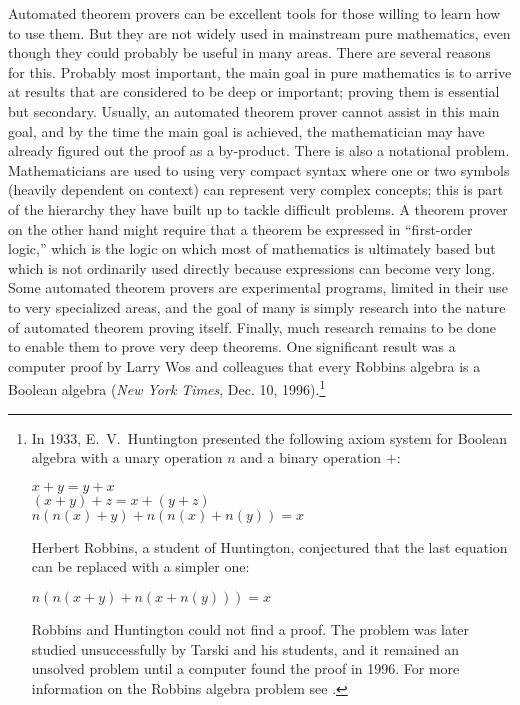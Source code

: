 Automated theorem provers can be excellent tools for those willing to learn
how to use them.  But they are not widely used in mainstream pure
mathematics, even though they could probably be useful in many areas.  There
are several reasons for this.  Probably most important, the main goal in pure
mathematics is to arrive at results that are considered to be deep or
important; proving them is essential but secondary.  Usually, an automated
theorem prover cannot assist in this main goal, and by the time the main goal
is achieved, the mathematician may have already figured out the proof as a
by-product.  There is also a notational problem.  Mathematicians are used to
using very compact syntax where one or two symbols (heavily dependent on
context) can represent very complex concepts; this is part of the
hierarchy they have built up to tackle difficult problems.  A
theorem prover on the other hand might require that a theorem be expressed in
``first-order logic,'' which is the logic on which
most of mathematics is ultimately based but which is not ordinarily used
directly because expressions can become very long.  Some automated theorem
provers are experimental programs, limited in their use to very specialized
areas, and the goal of many is simply research into the nature of automated
theorem proving itself.  Finally, much research remains to be done to enable
them to prove very deep theorems.  One significant result was a
computer proof by Larry Wos and colleagues that every Robbins
algebra is a Boolean  algebra
({\em New York Times}, Dec. 10, 1996).\footnote{In 1933, E.~V.\
Huntington
presented the following axiom system for
Boolean algebra with a unary operation $n$ and a binary operation $+$:
\begin{center}
    $x + y = y + x$ \\
    $(x + y) + z = x + (y + z)$ \\
    $n(n(x) + y) + n(n(x) + n(y)) = x$
\end{center}
Herbert Robbins, a student of Huntington, conjectured
that the last equation can be replaced with a simpler one:
\begin{center}
    $n(n(x + y) + n(x + n(y))) = x$
\end{center}
Robbins and Huntington could not find a proof.  The problem was
later studied unsuccessfully by Tarski and his
students, and it remained an unsolved problem until a
computer found the proof in 1996.  For more information on
the Robbins algebra problem see \cite{Wos}.}

